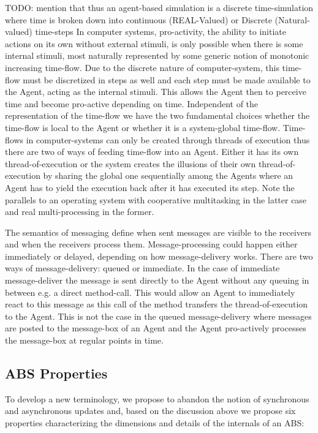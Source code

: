 TODO: mention that thus an agent-based simulation is a discrete time-simulation where time is broken down into continuous (REAL-Valued) or Discrete (Natural-valued) time-steps
In computer systems, pro-activity, the ability to initiate actions on its own without external stimuli, is only possible when there is some internal stimuli, most naturally represented by some generic notion of monotonic increasing time-flow. Due to the discrete nature of computer-system, this time-flow must be discretized in steps as well and each step must be made available to the Agent, acting as the internal stimuli. This allows the Agent then to perceive time and become pro-active depending on time. Independent of the representation of the time-flow we have the two fundamental choices whether the time-flow is local to the Agent or whether it is a system-global time-flow. Time-flows in computer-systems can only be created through threads of execution thus there are two of ways of feeding time-flow into an Agent. Either it has its own thread-of-execution or the system creates the illusions of their own thread-of-execution by sharing the global one sequentially among the Agents where an Agent has to yield the execution back after it has executed its step. Note the parallels to an operating system with cooperative multitasking in the latter case and real multi-processing in the former.

\medskip 

The semantics of messaging define when sent messages are visible to the receivers and when the receivers process them. Message-processing could happen either immediately or delayed, depending on how message-delivery works. There are two ways of message-delivery: queued or immediate. In the case of immediate message-deliver the message is sent directly to the Agent without any queuing in between e.g. a direct method-call. This would allow an Agent to immediately react to this message as this call of the method transfers the thread-of-execution to the Agent. This is not the case in the queued message-delivery where messages are posted to the message-box of an Agent and the Agent pro-actively processes the message-box at regular points in time.

\subsection{ABS Properties}
To develop a new terminology, we propose to abandon the notion of synchronous and asynchronous updates and, based on the discussion above we propose six properties characterizing the dimensions and details of the internals of an ABS:

